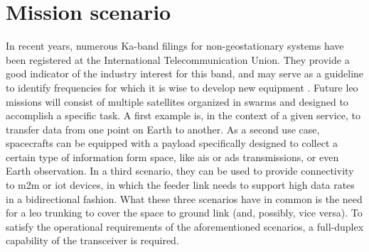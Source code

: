 \documentclass[conference,10pt,a4paper]{IEEEtran}%
\begin{document}
\section{Mission scenario}
\label{sec:mis-sce}
In recent years, numerous Ka-band filings for non-geostationary systems have been registered at the International Telecommunication Union.
They provide a good indicator of the industry interest for this band, and may serve as a guideline to identify frequencies for which it is wise to develop new equipment \cite{ioag2016}.
Future \ac{leo} missions will consist of multiple satellites organized in swarms and designed to accomplish a specific task.
A first example is, in the context of a given service, to transfer data from one point on Earth to another.
As a second use case, spacecrafts can be equipped with a payload specifically designed to collect a certain type of information form space, like \ac{ais} or \ac{ads} transmissions, or even Earth observation.
In a third scenario, they can be used to provide connectivity to \ac{m2m} or \ac{iot} devices, in which the feeder link needs to support high data rates in a bidirectional fashion.
What these three scenarios have in common is the need for a \ac{leo} trunking to cover the space to ground link (and, possibly, vice versa).
To satisfy the operational requirements of the aforementioned scenarios, a full-duplex capability of the transceiver is required.
\end{document}
